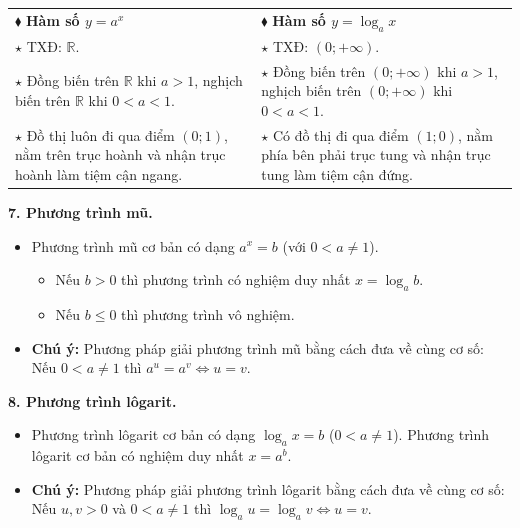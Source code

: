 \documentclass[12pt,a4paper]{extarticle}
\begin{document}
\begin{center}
\renewcommand{\arraystretch}{1.4}
\begin{tabular}{|p{}|p{}|}
\hline
{$\blacklozenge$} \textbf{Hàm số $y = a^x$} & {$\blacklozenge$} \textbf{Hàm số $y = \log_a x$} \\
$\star$ TXĐ: $\mathbb{R}$. & $\star$ TXĐ: $(0; +\infty)$. \\
$\star$ Đồng biến trên $\mathbb{R}$ khi $a > 1$, nghịch biến trên $\mathbb{R}$ khi $0 < a < 1$. & $\star$ Đồng biến trên $(0; +\infty)$ khi $a > 1$, nghịch biến trên $(0; +\infty)$ khi $0 < a < 1$. \\
$\star$ Đồ thị luôn đi qua điểm $(0; 1)$, nằm trên trục hoành và nhận trục hoành làm tiệm cận ngang. & $\star$ Có đồ thị đi qua điểm $(1; 0)$, nằm phía bên phải trục tung và nhận trục tung làm tiệm cận đứng. \\
\hline
\end{tabular}
\end{center}

\noindent\textbf{7. Phương trình mũ.}
\begin{itemize}
    \item Phương trình mũ cơ bản có dạng $a^x = b$ (với $0 < a \ne 1$).
    \begin{itemize}
        \item[-] Nếu $b > 0$ thì phương trình có nghiệm duy nhất $x = \log_a b$.
        \item[-] Nếu $b \le 0$ thì phương trình vô nghiệm.
    \end{itemize}
    \item \textbf{Chú ý:} Phương pháp giải phương trình mũ bằng cách đưa về cùng cơ số: Nếu $0 < a \ne 1$ thì $a^u = a^v \Leftrightarrow u = v$.
\end{itemize}

\noindent\textbf{8. Phương trình lôgarit.}
\begin{itemize}
    \item Phương trình lôgarit cơ bản có dạng $\log_a x = b$ ($0 < a \ne 1$). Phương trình lôgarit cơ bản có nghiệm duy nhất $x = a^b$.
    \item \textbf{Chú ý:} Phương pháp giải phương trình lôgarit bằng cách đưa về cùng cơ số: Nếu $u, v > 0$ và $0 < a \ne 1$ thì $\log_a u = \log_a v \Leftrightarrow u = v$.
\end{itemize}
\end{document}
